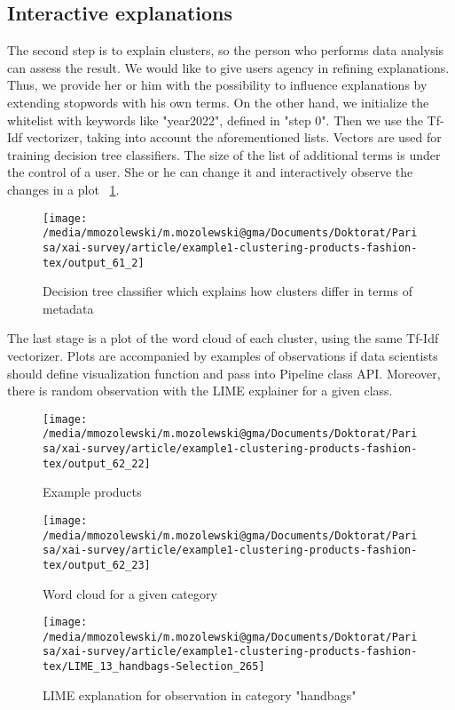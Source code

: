 \documentclass[
 twocolumn,
]{ceurart}
\begin{document}
\subsection{Interactive explanations}
The second step is to explain clusters, so the person who performs data analysis can assess the result.
We would like to give users agency in refining explanations.
Thus, we provide her or him with the possibility to influence explanations by extending stopwords with his own terms.
On the other hand, we initialize the whitelist with keywords like "year2022", defined in "step 0".
Then we use the Tf-Idf vectorizer, taking into account the aforementioned lists.
Vectors are used for training decision tree classifiers.
The size of the list of additional terms is under the control of a user.
She or he can change it and interactively observe the changes in a plot ~\ref{fig:decision_tree}.
\begin{figure}[h!]
  \centering
  \texttt{[image: /media/mmozolewski/m.mozolewski@gma/Documents/Doktorat/Parisa/xai-survey/article/example1-clustering-products-fashion-tex/output\_61\_2]}
  \caption{Decision tree classifier which explains how clusters differ in terms of metadata}
  \label{fig:decision_tree}
\end{figure}
The last stage is a plot of the word cloud of each cluster, using the same Tf-Idf vectorizer.
Plots are accompanied by examples of observations if data scientists should define visualization function and pass into Pipeline class API.
Moreover, there is random observation with the LIME explainer for a given class.
\begin{figure}[h!]
  \centering
  \texttt{[image: /media/mmozolewski/m.mozolewski@gma/Documents/Doktorat/Parisa/xai-survey/article/example1-clustering-products-fashion-tex/output\_62\_22]}
  \caption{Example products}
  \label{fig:example_products}
\end{figure}
\begin{figure}[h!]
  \centering
  \texttt{[image: /media/mmozolewski/m.mozolewski@gma/Documents/Doktorat/Parisa/xai-survey/article/example1-clustering-products-fashion-tex/output\_62\_23]}
  \caption{Word cloud for a given category}
  \label{fig:wordcloud}
\end{figure}
\begin{figure}[h!]
  \centering
  \texttt{[image: /media/mmozolewski/m.mozolewski@gma/Documents/Doktorat/Parisa/xai-survey/article/example1-clustering-products-fashion-tex/LIME\_13\_handbags-Selection\_265]}
  \caption{LIME explanation for observation in category "handbags"}
  \label{fig:lime}
\end{figure}
\end{document}
